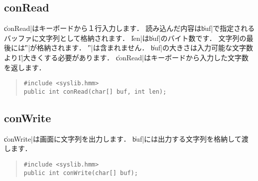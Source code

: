 \subsection{conRead}

\|conRead|はキーボードから１行入力します．
読み込んだ内容は\|buf|で指定されるバッファに文字列として格納されます．
\|len|は\|buf|のバイト数です．
文字列の最後には\|'\0'|が格納されます．
\|'\n'|は含まれません．
\|buf|の大きさは入力可能な文字数より\|1|大きくする必要があります．
\|conRead|はキーボードから入力した文字数を返します．

\begin{quote}
\begin{verbatim}
#include <syslib.hmm>
public int conRead(char[] buf, int len);
\end{verbatim}
\end{quote}

\subsection{conWrite}

\|conWrite|は画面に文字列を出力します．
\|buf|には出力する文字列を格納して渡します．

\begin{quote}
\begin{verbatim}
#include <syslib.hmm>
public int conWrite(char[] buf);
\end{verbatim}
\end{quote}
